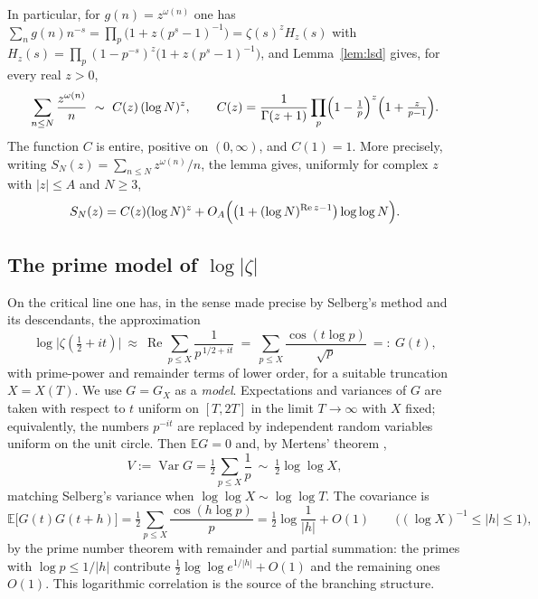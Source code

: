 \documentclass[11pt]{amsart}
\theoremstyle{definition}
\newcommand{\Ee}{\mathbb E}
\newcommand{\re}{\operatorname{Re}}
\newcommand{\Var}{\operatorname{Var}}
\newcommand{\half}{\tfrac12}
\newcommand{\loglog}{\log\log}
\begin{document}
In particular, for $g(n)=z^{\omega(n)}$ one has
$\sum_n g(n)n^{-s}=\prod_p\bigl(1+z(p^s-1)^{-1}\bigr)=\zeta(s)^zH_z(s)$ with
$H_z(s)=\prod_p(1-p^{-s})^{z}\bigl(1+z(p^s-1)^{-1}\bigr)$, and Lemma~\ref{lem:lsd} gives, for every real $z>0$,
\begin{equation}\label{eq:zomega}
\sum_{n\le N}\frac{z^{\omega(n)}}{n}\ \sim\ C(z)\,(\log N)^{z},\qquad
C(z)=\frac{1}{\Gamma(z+1)}\prod_p\Bigl(1-\tfrac1p\Bigr)^{z}\Bigl(1+\tfrac{z}{p-1}\Bigr).
\end{equation}
The function $C$ is entire, positive on $(0,\infty)$, and $C(1)=1$. More precisely, writing
$S_N(z)=\sum_{n\le N}z^{\omega(n)}/n$, the lemma gives, uniformly for complex $z$ with $|z|\le A$ and $N\ge3$,
\[
S_N(z)=C(z)(\log N)^z+O_A\Bigl(\bigl(1+(\log N)^{\re z-1}\bigr)\loglog N\Bigr).
\]

\subsection{The prime model of \texorpdfstring{$\log|\zeta|$}{log|zeta|}}
On the critical line one has, in the sense made precise by Selberg's method \cite{Selberg} and its descendants,
the approximation
\[
\log\bigl|\zeta(\half+it)\bigr|\ \approx\ \re\sum_{p\le X}\frac{1}{p^{\,1/2+it}}\ =\ \sum_{p\le X}\frac{\cos(t\log p)}{\sqrt p}\ =:\ G(t),
\]
with prime-power and remainder terms of lower order, for a suitable truncation $X=X(T)$. We use $G=G_X$ as a
\emph{model}. Expectations and variances of $G$ are taken with respect to $t$ uniform on $[T,2T]$ in the limit
$T\to\infty$ with $X$ fixed; equivalently, the numbers $p^{-it}$ are replaced by independent random variables
uniform on the unit circle. Then $\Ee G=0$ and, by Mertens' theorem \cite{Mertens},
\begin{equation}\label{eq:variance}
V:=\Var G=\half\sum_{p\le X}\frac1p\ \sim\ \half\loglog X,
\end{equation}
matching Selberg's variance when $\loglog X\sim\loglog T$. The covariance is
\[
\Ee\bigl[G(t)G(t+h)\bigr]=\half\sum_{p\le X}\frac{\cos(h\log p)}{p}=\half\log\frac1{|h|}+O(1)
\qquad\bigl((\log X)^{-1}\le|h|\le1\bigr),
\]
by the prime number theorem with remainder and partial summation: the primes with $\log p\le1/|h|$ contribute
$\half\loglog e^{1/|h|}+O(1)$ and the remaining ones $O(1)$. This logarithmic correlation is the source of the
branching structure.
\end{document}
